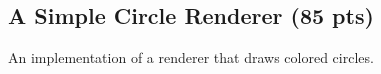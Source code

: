 \documentclass[letterpaper,11pt]{exam}
\begin{document}
\begin{questions}
\begin{enumerate}[label=\roman*.]


    \end{enumerate}



    \newpage

    \question
    \subsection*{A Simple Circle Renderer (85 pts)}

    An implementation of a renderer that draws colored circles.


\end{questions}
\end{document}
